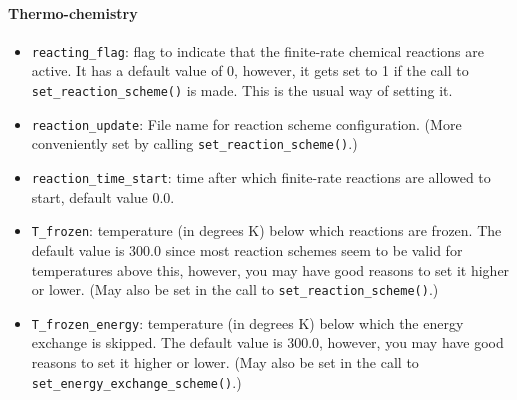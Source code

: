 \paragraph{Thermo-chemistry}
\begin{itemize}
\item \texttt{reacting\_flag}: flag to indicate that the finite-rate chemical
  reactions are active.
  It has a default value of 0, however, it gets set to 1 if the call 
  to \texttt{set\_reaction\_scheme()} is made.
  This is the usual way of setting it.
\item \texttt{reaction\_update}: File name for reaction scheme configuration.
  (More conveniently set by calling \texttt{set\_reaction\_scheme()}.)
\item \texttt{reaction\_time\_start}: time after which finite-rate reactions are allowed to start,
  default value 0.0.
\item \texttt{T\_frozen}: temperature (in degrees K) below which reactions are frozen.
  The default value is 300.0 since most reaction schemes seem to be valid for temperatures
  above this, however, you may have good reasons to set it higher or lower.
  (May also be set in the call to \texttt{set\_reaction\_scheme()}.)
\item \texttt{T\_frozen\_energy}: temperature (in degrees K) below which the energy exchange is skipped.
  The default value is 300.0, however, you may have good reasons to set it higher or lower.
  (May also be set in the call to \texttt{set\_energy\_exchange\_scheme()}.)
\end{itemize}

